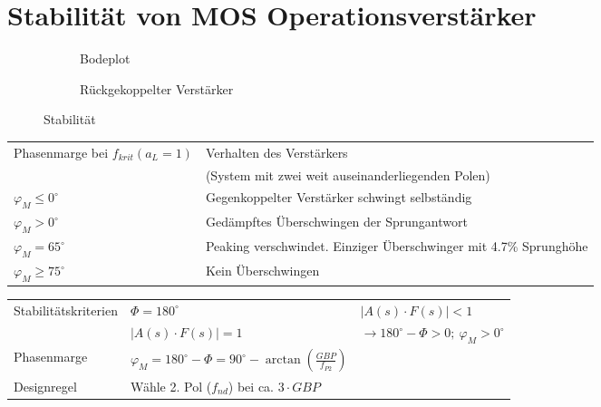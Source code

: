 \section{Stabilität von MOS Operationsverstärker}
\begin{figure}[!h]
	\centering
	\begin{subfigure}[b]{10cm}
		\centering
		\caption{Bodeplot}
	\end{subfigure}\qquad
	\begin{subfigure}[b]{8cm}
		\centering
		{}
		\caption{Rückgekoppelter Verstärker}
	\end{subfigure}
	\caption{Stabilität}
	\label{fig:stabilitaet}
\end{figure}

\begin{tabular}{|l|l|}
\hline
	Phasenmarge bei $f_{krit}(a_L=1)$ &
	Verhalten des Verstärkers \\
	& (System mit zwei weit auseinanderliegenden Polen) \\\hline
	$\varphi_M \leq 0^\circ$ & 
	Gegenkoppelter Verstärker schwingt selbständig \\\hline
	$\varphi_M > 0^\circ$ &
	Gedämpftes Überschwingen der Sprungantwort \\\hline
	$\varphi_M = 65^\circ$ &
	Peaking verschwindet. Einziger Überschwinger mit 4.7\% Sprunghöhe \\\hline
	$\varphi_M \geq 75^\circ$ &
	Kein Überschwingen \\\hline
\end{tabular}

\begin{tabular}{lll}
Stabilitätskriterien & $\Phi = 180^\circ$ & $ \left|A(s)\cdot F(s)\right|<1 $ \\
& $ \left|A(s)\cdot F(s)\right|= 1 $ & $ \rightarrow 180^\circ-\Phi>0;\
\varphi_M>0^\circ $ \\
Phasenmarge & $\varphi_M=180^\circ-\Phi =90^\circ - \arctan(\frac{GBP}{f_{P2}})$ & \\
Designregel & Wähle 2. Pol ($f_{nd}$) bei ca. $3\cdot GBP$& \\
\end{tabular}